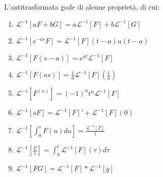             L'antitrasformata gode di alcune proprietà, di cui:
            \begin{enumerate}[label=(\arabic*)]
                \item $\mathcal{L}^{-1}[aF + bG] = a\mathcal{L}^{-1}[F] + b\mathcal{L}^{-1}[G]$
                \item $\mathcal{L}^{-1}[e^{-as}F] = \mathcal{L}^{-1}[F](t - a)u(t - a)$
                \item $\mathcal{L}^{-1}[F(s - a)] = e^{at}\mathcal{L}^{-1}[F]$
                \item $\mathcal{L}^{-1}[F(as)] = \displaystyle \frac{1}{a} \mathcal{L}^{-1}[F]\left(\frac{t}{a}\right)$
                \item $\mathcal{L}^{-1}[F^{(n)}] = (-1)^{n}t^{n}\mathcal{L}^{-1}[F]$
                \item $\mathcal{L}^{-1}[sF] = \mathcal{L}^{-1}[F]' + \mathcal{L}^{-1}[F](0)$
                \item $\mathcal{L}^{-1}\left[\displaystyle \int_{0}^{s} F(u) du \right] = \displaystyle \frac{\mathcal{L}^{-1}[F]}{t}$
                \item $\mathcal{L}^{-1}\left[ \displaystyle \frac{F}{s} \right] = \displaystyle \int_{0}^{t}\mathcal{L}^{-1}[F](\tau) d\tau$
                \item $\mathcal{L}^{-1}[FG] = \mathcal{L}^{-1}[F] * \mathcal{L}^{-1}[g]$
            \end{enumerate}
